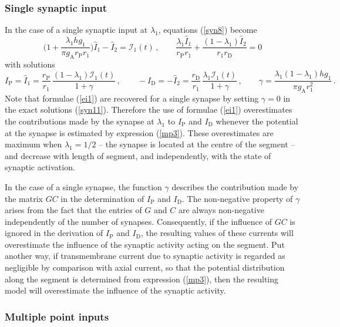 \subsubsection{Single synaptic input}\label{single}
In the case of a single synaptic input at $\lambda_1$, equations
(\ref{syn8}) become
\begin{equation}\label{syn10}
\Big(1+\frac{\lambda_1 h g_1}{\pi g_\mathrm{A} r_\mathrm{P}
r_1}\Big)\widehat{I}_1-\widehat{I}_2 = \mathcal{I}_1(t)\,,\qquad
\frac{\lambda_1 \widehat{I}_1}{r_\mathrm{P}r_1}
+\frac{(1-\lambda_1) \widehat{I}_2}{r_1r_\mathrm{D}} = 0
\end{equation}
with solutions
\begin{equation}\label{syn11}
I_\mathrm{P}=\widehat{I}_1=\frac{r_\mathrm{P}}{r_1}\,\frac{(1-\lambda_1)\mathcal{I}_1(t)}
{1+\gamma}\,,\qquad
-I_\mathrm{D}=-\widehat{I}_2=\frac{r_\mathrm{D}}{r_1}\,\frac{\lambda_1\mathcal{I}_1(t)}
{1+\gamma}\,,\qquad\gamma=\frac{\lambda_1(1-\lambda_1 )h g_1}{\pi
g_\mathrm{A} r^2_1}\,.
\end{equation}
Note that formulae (\ref{ei1}) are recovered for a single synapse
by setting $\gamma=0$ in the exact solutions (\ref{syn11}).
Therefore the use of formulae (\ref{ei1}) overestimates the
contributions made by the synapse at $\lambda_1$ to $I_\mathrm{P}$
and $I_\mathrm{D}$ whenever the potential at the synapse is
estimated by expression (\ref{mp3}). These overestimates are
maximum when $\lambda_1=1/2$ -- the synapse is located at the
centre of the segment -- and decrease with length of segment, and
independently, with the state of synaptic activation.

In the case of a single synapse, the function $\gamma$ describes
the contribution made by the matrix $GC$ in the determination of
$I_\mathrm{P}$ and $I_\mathrm{D}$. The non-negative property of
$\gamma$ arises from the fact that the entries of $G$ and $C$ are
always non-negative independently of the number of synapses.
Consequently, if the influence of $GC$ is ignored in the
derivation of $I_\mathrm{P}$ and $I_\mathrm{D}$, the resulting
values of these currents will overestimate the influence of the
synaptic activity acting on the segment. Put another way, if
transmembrane current due to synaptic activity is regarded as
negligible by comparison with axial current, so that the potential
distribution along the segment is determined from expression
(\ref{mp3}), then the resulting model will overestimate the
influence of the synaptic activity.

\subsubsection{Multiple point inputs}


